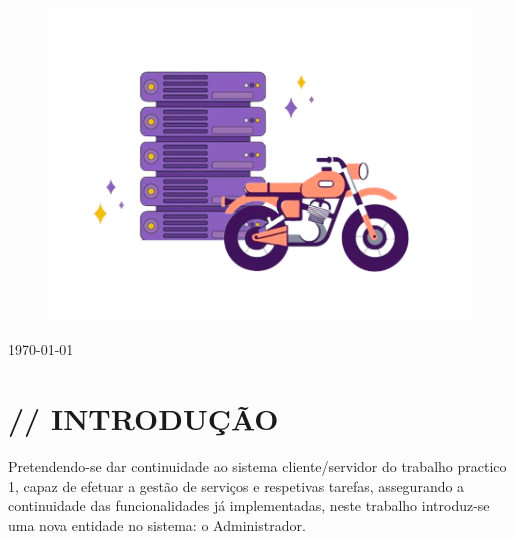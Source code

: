 \documentclass[12pt]{article}
\begin{document}
\begin{titlepage}
\begin{figure}[H]
    \centering
    \includegraphics[width=12cm]{ilustracaocapa}
\end{figure}
	
	\vfill\vfill\vfill %
	
	{\large\today} %
	
	
	 
	
	\vfill %
	
\end{titlepage}



\textsc{\tableofcontents}

\newpage


\section{// INTRODUÇÃO}
Pretendendo-se dar continuidade ao sistema cliente/servidor do trabalho practico 1, capaz de efetuar a gestão de
serviços e respetivas tarefas, assegurando a continuidade das funcionalidades já implementadas, neste trabalho introduz-se uma nova entidade no sistema: o Administrador.\\
\end{document}
